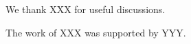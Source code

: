 \documentclass[twocolumn]{svjour3}
\begin{document}

\begin{acknowledgements}

We thank XXX for useful discussions.

The work of XXX was supported by YYY.

\end{acknowledgements}




\end{document}
